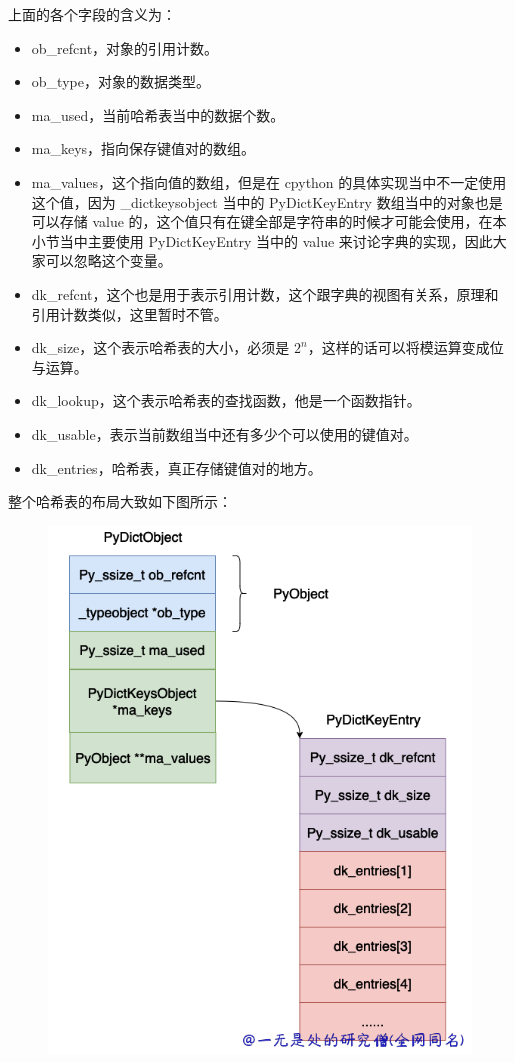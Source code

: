 上面的各个字段的含义为：
\begin{itemize}
\item ob\_refcnt，对象的引用计数。 
\item ob\_type，对象的数据类型。 
\item ma\_used，当前哈希表当中的数据个数。 
\item ma\_keys，指向保存键值对的数组。 
\item ma\_values，这个指向值的数组，但是在 cpython 的具体实现当中不一定使用这个值，因为 \_dictkeysobject 当中的 PyDictKeyEntry 数组当中的对象也是可以存储 value 的，这个值只有在键全部是字符串的时候才可能会使用，在本小节当中主要使用 PyDictKeyEntry 当中的 value 来讨论字典的实现，因此大家可以忽略这个变量。 
\item dk\_refcnt，这个也是用于表示引用计数，这个跟字典的视图有关系，原理和引用计数类似，这里暂时不管。 
\item dk\_size，这个表示哈希表的大小，必须是 $2^n$，这样的话可以将模运算变成位与运算。 
\item dk\_lookup，这个表示哈希表的查找函数，他是一个函数指针。 
\item dk\_usable，表示当前数组当中还有多少个可以使用的键值对。 
\item dk\_entries，哈希表，真正存储键值对的地方。 
\end{itemize}
整个哈希表的布局大致如下图所示：

    \begin{figure}[H]
        \centering
            \includegraphics[scale=.25]{images/27-dict.png}
            \caption{ }
        \label{fig:my_label}
    \end{figure}
    
